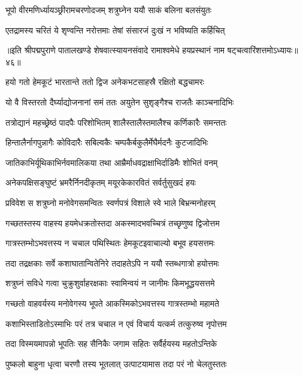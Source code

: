 \twolineshloka
{भूपो वीरमणिर्ध्यायञ्छ्रीरामचरणोदजम्}
{शत्रुघ्नेन ययौ साकं बलिना बलसंयुतः}%

\twolineshloka
{एतद्रामस्य चरितं ये शृण्वन्ति नरोत्तमाः}
{तेषां संसारजं दुःखं न भविष्यति कर्हिचित्}%

॥इति श्रीपद्मपुराणे पातालखण्डे शेषवात्स्यायनसंवादे रामाश्वमेधे हयप्रस्थानं नाम षट्चत्वारिंशत्तमोऽध्यायः॥४६॥



\twolineshloka
{हयो गतो हेमकूटं भारतान्ते ततो द्विज}
{अनेकभटसाहस्रै रक्षितो बद्धचामरः}%

\twolineshloka
{यो वै विस्तरतो दैर्घ्याद्योजनानां समं ततः}
{अयुतेन सुशृङ्गैश्च राजतैः काञ्चनादिभिः}%

\twolineshloka
{तत्रोद्यानं महच्छ्रेष्ठं पादपैः परिशोभितम्}
{शालैस्तालैस्तमालैश्च कर्णिकारैः समन्ततः}%

\twolineshloka
{हिन्तालैर्नागपुन्नागैः कोविदारैः सबिल्वकैः}
{चम्पकैर्बकुलैर्मेघैर्मदनैः कुटजादिभिः}%

\twolineshloka
{जातिकाभिर्यूथिकाभिर्नवमालिकया तथा}
{आम्रैर्माधवद्राक्षाभिर्दाडिमैः शोभितं वनम्}%

\twolineshloka
{अनेकपक्षिसङ्घुष्टं भ्रमरैर्निनदीकृतम्}
{मयूरकेकारवितं सर्वर्तुसुखदं हयः}%

\twolineshloka
{प्रविवेश स शत्रुघ्नो मनोवेगसमन्वितः}
{स्वर्णपत्रं विशाले स्वे भाले बिभ्रन्मनोहरम्}%

\twolineshloka
{गच्छतस्तस्य वाहस्य हयमेधक्रतोस्तदा}
{अकस्मादभवच्चित्रं तच्छृणुष्व द्विजोत्तम}%

\twolineshloka
{गात्रस्तम्भोऽभवत्तस्य न चचाल पथिस्थितः}
{हेमकूटइवाचाल्यो बभूव हयसत्तमः}%

\twolineshloka
{तदा तद्रक्षकाः सर्वे कशाघातान्वितेनिरे}
{तदाहतेऽपि न ययौ स्तब्धगात्रो हयोत्तमः}%

\twolineshloka
{शत्रुघ्नं सविधे गत्वा चुक्रुशुर्वाहरक्षकाः}
{स्वामिन्वयं न जानीमः किमभूद्धयसत्तमे}%

\twolineshloka
{गच्छतो वाहवर्यस्य मनोवेगस्य भूपते}
{आकस्मिकोऽभवत्तस्य गात्रस्तम्भो महामते}%

\twolineshloka
{कशाभिस्ताडितोऽस्माभिः परं तत्र चचाल न}
{एवं विचार्य यत्कर्म तत्कुरुष्व नृपोत्तम}%

\twolineshloka
{तदा विस्मयमापन्नो भूपतिः सह सैनिकैः}
{जगाम सहितः सर्वैर्हयस्य महतोऽन्तिके}%

\twolineshloka
{पुष्कलो बाहुना धृत्वा चरणौ तस्य भूतलात्}
{उत्पाटयामास तदा परं नो चेलतुस्ततः}%

